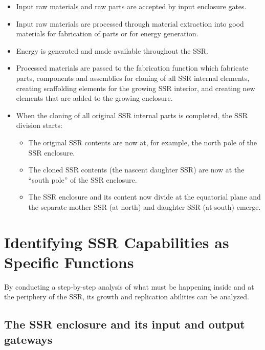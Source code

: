 \begin{itemize}
\item Input raw materials and raw parts are accepted by input enclosure
gates.
\item Input raw materials are processed through material extraction into
good materials for fabrication of parts or for energy generation.
\item Energy is generated and made available throughout the SSR.
\item Processed materials are passed to the fabrication function which fabricate parts, components and
assemblies for cloning of all SSR internal elements, creating scaffolding elements for the growing SSR interior, and creating new elements that are added to the growing enclosure.
\item When the cloning of all original SSR internal parts is completed,
the SSR division starts:

\begin{itemize}
\item The original SSR contents are now at, for example, the north pole
of the SSR enclosure.
\item The cloned SSR contents (the nascent daughter SSR) are now at the
“south pole” of the SSR enclosure.
\item The SSR enclosure and its content now divide at the equatorial
plane and the separate mother SSR (at north) and daughter SSR (at south)
emerge.
\end{itemize}
\end{itemize}

\section[Identifying SSR Capabilities]{Identifying SSR Capabilities as Specific Functions}

By conducting a step-by-step analysis of what must be happening inside and at
the periphery of the SSR, its growth and replication abilities can be analyzed.

\subsection[The SSR enclosure and its input and output gateways]{The SSR enclosure and its input and output gateways}

